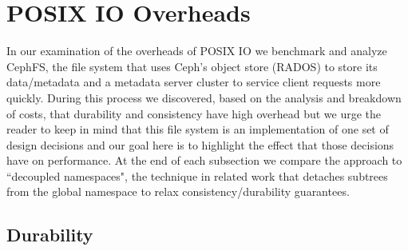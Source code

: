\section{POSIX IO Overheads}
\label{sec:posix-overheads}

In our examination of the overheads of POSIX IO we benchmark and analyze
CephFS, the file system that uses Ceph's object store (RADOS) to
store its data/metadata and a metadata server cluster to service client requests
more quickly.  During this process we discovered, based on the analysis and
breakdown of costs, that durability and consistency have high overhead but we
urge the reader to keep in mind that this file system is an implementation of
one set of design decisions and our goal here is to highlight the effect that
those decisions have on performance.  At the end of each subsection we compare
the approach to ``decoupled namespaces", the technique in related work that
detaches subtrees from the global namespace to relax consistency/durability
guarantees. 


\subsection{Durability}
\label{sec:durability}

